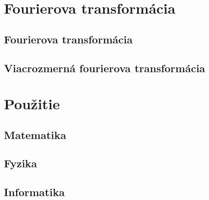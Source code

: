 



\chapter{Fourierova transformácia}
    
    
    
    
\section{Fourierova transformácia}
\section{Viacrozmerná fourierova transformácia}
    

%    
%    
%    
%    
%    
%    
%    
%    
%    
%    

\chapter{Použitie}
\section{Matematika}
    
    
    
    
    
         
\section{Fyzika}
    
    
    
    
    
\section{Informatika}
    
    
    
    
    
    
    
    

